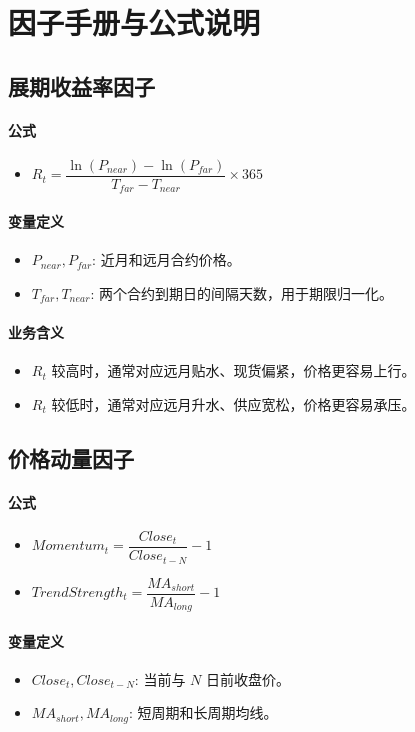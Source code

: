\documentclass[11pt,a4paper]{ctexart}
\begin{document}
        \section{因子手册与公式说明}
\subsection{展期收益率因子}
\paragraph{公式}
\begin{itemize}
\item $R_t=\dfrac{\ln(P_{near})-\ln(P_{far})}{T_{far}-T_{near}}\times 365$
\end{itemize}
\paragraph{变量定义}
\begin{itemize}
\item $P_{near}, P_{far}$: 近月和远月合约价格。
\item $T_{far}, T_{near}$: 两个合约到期日的间隔天数，用于期限归一化。
\end{itemize}
\paragraph{业务含义}
\begin{itemize}
\item $R_t$ 较高时，通常对应远月贴水、现货偏紧，价格更容易上行。
\item $R_t$ 较低时，通常对应远月升水、供应宽松，价格更容易承压。
\end{itemize}
\subsection{价格动量因子}
\paragraph{公式}
\begin{itemize}
\item $Momentum_t=\dfrac{Close_t}{Close_{t-N}}-1$
\item $TrendStrength_t=\dfrac{MA_{short}}{MA_{long}}-1$
\end{itemize}
\paragraph{变量定义}
\begin{itemize}
\item $Close_t, Close_{t-N}$: 当前与 $N$ 日前收盘价。
\item $MA_{short}, MA_{long}$: 短周期和长周期均线。
\end{itemize}
\end{document}
